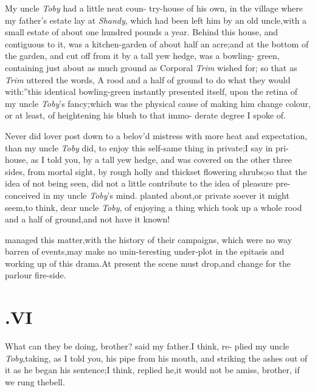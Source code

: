 \documentclass{article}
\begin{document}
My uncle \textit{Toby} had a little neat coun-\break
try-house of his own, in the village where my father’s estate lay at \textit{Shandy},
which had been left him by an old uncle,\break with a small estate of
about one hundred pounds a year. Behind this house, and contiguous
to it, was a kitchen-garden of about half an acre;\tsk and at the
bottom of the garden, and cut off from it\break
by a tall yew hedge, was a bowling-\break 
green, containing just about as much
ground as Corporal
\textit{Trim} wished for;\tsk\break
so that as \textit{Trim} uttered the
words, \lqq A rood and a half of ground to do what\break
they would with:”\tsh this identical bowling-green instantly presented
itself,  upon the retina
of my uncle \textit{Toby}’s fancy;\break\tsh which was the physical
cause of making him change colour, or at least, of heightening his
blush to that immo-\break
derate degree I spoke of.

Never did lover post down to a belov’d mistress with more heat
and expectation, than my uncle \textit{Toby} did, to enjoy this\break
self-same thing in private;\tsk I say in pri-\break
{} house, as
I told you, by a tall yew hedge, and was covered on the other three
sides, from mortal sight, by rough holly and thickset flowering
shrubs;\tsk so that the
idea of not being seen, did not a little contribute to the
idea of pleasure pre-conceived in my uncle \textit{Toby}’s
mind.\tsk\break 
{}
planted about,\tsh or private soever it\break 
might seem,\tsk to think, dear uncle \textit{Toby}, 
of enjoying a thing which took up a\break
whole rood and a half of ground,\tsk and\break
not have it known!

 managed this
matter,\tsk with the history of their campaigns, which were no
way barren of events,\tsh may make no unin-\break teresting
under-plot in the epitasis and working up of this drama.\tsk At
present the scene must drop,\tsk and change for the parlour
fire-side.

\null
\section{.\enspace  VI}

\quad\tsh What can they be doing,\break
brother? said my father.\tsk I think, re-\break
plied my uncle \textit{Toby},\tsk taking, as I told you,
his pipe from his mouth, and striking the ashes out of it as he
began his sentence;\tsh I think, replied he,\tsk it
would not be amiss, brother, if we rung the\break bell.
\end{document}
